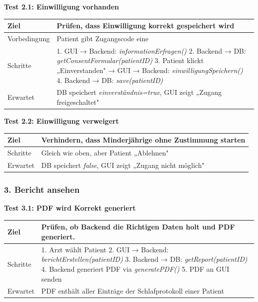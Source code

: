 \textbf{Test 2.1: Einwilligung vorhanden} \\
\begin{tabular}{|p{4cm}|p{10cm}|}
    \hline
    Ziel & Prüfen, dass Einwilligung korrekt gespeichert wird \\
    \hline
    Vorbedingung & Patient gibt Zugangscode eine \\
    \hline
    Schritte & 
    1. GUI → Backend: \textit{informationErfragen()} 
    2. Backend → DB: \textit{getConsentFormular(patientID)} 
    3. Patient klickt „Einverstanden" → GUI → Backend: \textit{einwilligungSpeichern()} 
    4. Backend → DB: \textit{save(patientID)} \\
    \hline
    Erwartet & DB speichert \textit{einverständnis=true}, GUI zeigt „Zugang freigeschaltet" \\
    \hline
\end{tabular}

\vspace{0.5cm}

\textbf{Test 2.2: Einwilligung verweigert} \\
\begin{tabular}{|p{4cm}|p{10cm}|}
    \hline
    Ziel & Verhindern, dass Minderjährige ohne Zustimmung starten \\
    \hline
    Schritte & Gleich wie oben, aber Patient „Ablehnen" \\
    \hline
    Erwartet & DB speichert \textit{false}, GUI zeigt „Zugang nicht möglich" \\
    \hline
\end{tabular}

\vspace{1cm}

\subsubsection*{3. Bericht ansehen}

\textbf{Test 3.1: PDF wird Korrekt generiert} \\
\begin{tabular}{|p{4cm}|p{10cm}|}
    \hline
    Ziel & Prüfen, ob Backend die Richtigen Daten holt und PDF generiert. \\
    \hline
    Schritte & 
    1. Arzt wählt Patient 
    2. GUI → Backend: \textit{berichtErstellen(patientID)} 
    3. Backend → DB: \textit{getReport(patientID)} 
    4. Backend generiert PDF via \textit{generatePDF()} 
    5. PDF an GUI senden \\
    \hline
    Erwartet & PDF enthält aller Einträge der Schlafprotokoll einer Patient \\
    \hline
\end{tabular}

